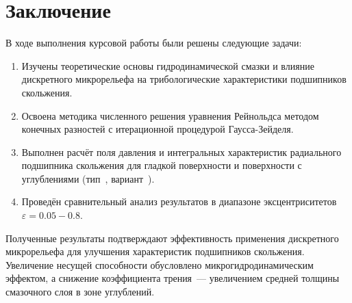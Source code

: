 \section*{Заключение}
{}

В ходе выполнения курсовой работы были решены следующие задачи:

\begin{enumerate}
    \item Изучены теоретические основы гидродинамической смазки и влияние дискретного микрорельефа на трибологические характеристики подшипников скольжения.

    \item Освоена методика численного решения уравнения Рейнольдса методом конечных разностей с итерационной процедурой Гаусса-Зейделя.

    \item Выполнен расчёт поля давления и интегральных характеристик радиального подшипника скольжения для гладкой поверхности и поверхности с \varDimpleTypeGenitive{} углублениями (тип~\varDimpleType, вариант~\varNumber).

    \item Проведён сравнительный анализ результатов в диапазоне эксцентриситетов $\varepsilon = 0.05 - 0.8$.
\end{enumerate}

Полученные результаты подтверждают эффективность применения дискретного микрорельефа для улучшения характеристик подшипников скольжения. Увеличение несущей способности обусловлено микрогидродинамическим эффектом, а снижение коэффициента трения~--- увеличением средней толщины смазочного слоя в зоне углублений.

\newpage
